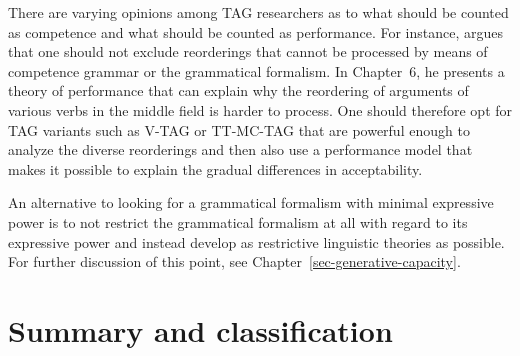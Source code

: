 \addlines
There are varying opinions among TAG researchers as to what should be counted as competence and what
should be counted as performance. For instance, \citet[]{Rambow94a} argues that one should
not exclude reorderings that cannot be processed by means of competence grammar or the grammatical
formalism. In Chapter~6, he presents a theory of performance that can explain why the reordering of
arguments of various verbs in the middle field is harder to process.
One should therefore opt for TAG variants such as V-TAG or TT-MC-TAG \citep{Lichte2007a} that are powerful enough to analyze the diverse reorderings
	and then also use a performance model that makes it possible to explain the gradual differences in acceptability.

An alternative to looking for a grammatical formalism with minimal expressive power is to not restrict the grammatical formalism at all with regard
to its expressive power and instead develop as restrictive linguistic theories as possible. For further discussion of this point, see 
Chapter~\ref{sec-generative-capacity}.

\section{Summary and classification}

